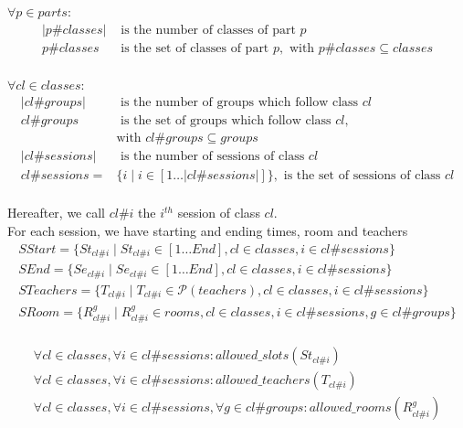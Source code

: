 $\forall p \in parts$:
$$
\begin{array}{rl}
|p\#classes| & \mbox{ is the number of classes of part } p\\
p\#classes & \mbox{ is the set of classes of part } p, \mbox{ with } p\#classes \subseteq classes\\
\end{array}
$$

$\forall cl \in classes$:
$$
\begin{array}{rl}
|cl\#groups| & \mbox{ is the number of groups which follow class } cl\\
cl\#groups & \mbox{ is the set of groups which follow class } cl,\\
            & \mbox{with } cl\#groups \subseteq groups\\
|cl\#sessions| & \mbox{ is the number of sessions of class } cl\\
cl\#sessions = & \{ i \;|\; i \in [1 \dots |cl\#sessions|] \}, \mbox{ is the set of sessions of class } cl\\
\end{array}
$$

Hereafter, we call $cl\#i$ the $i^{th}$ session of class $cl$.\\

For each session, we have starting and ending times, room and teachers
\begin{align*}
     SStart = \{ St_{cl\#i} \;|\; St_{cl\#i} \in [1 \dots End], cl \in classes, i \in cl\#sessions \} \\
     SEnd = \{ Se_{cl\#i} \;|\; Se_{cl\#i} \in [1 \dots End], cl \in classes, i \in cl\#sessions \} \\
     STeachers = \{ T_{cl\#i} \;|\; T_{cl\#i} \in \mathcal{P}(teachers), cl \in classes, i \in cl\#sessions \} \\
     SRoom = \{ R_{cl\#i}^g \;|\; R_{cl\#i}^g \in rooms, cl \in classes, i \in cl\#sessions, g \in cl\#groups \} \\
\end{align*}

\begin{align}
\forall cl \in classes, \forall i \in cl\#sessions : allowed\_slots(St_{cl\#i}) \\
\forall cl \in classes, \forall i \in cl\#sessions : allowed\_teachers(T_{cl\#i}) \\
\forall cl \in classes, \forall i \in cl\#sessions, \forall g \in cl\#groups : allowed\_rooms(R_{cl\#i}^g)
\end{align}


